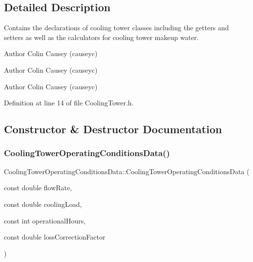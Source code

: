 \subsection{Detailed Description}
Contains the declarations of cooling tower classes including the getters and setters as well as the calculators for cooling tower makeup water. 

\begin{DoxyAuthor}{Author}
Colin Causey (causeyc) 
\end{DoxyAuthor}


\begin{DoxyAuthor}{Author}
Colin Causey (causeyc) 
\end{DoxyAuthor}


\begin{DoxyAuthor}{Author}
Colin Causey (causeyc) 
\end{DoxyAuthor}


Definition at line 14 of file Cooling\+Tower.\+h.



\subsection{Constructor \& Destructor Documentation}
\mbox{\label{class_cooling_tower_operating_conditions_data_a51e6445c137db249bdc8d02ff1e1b7ff}} 
\subsubsection{\texorpdfstring{Cooling\+Tower\+Operating\+Conditions\+Data()}{CoolingTowerOperatingConditionsData()}\hspace{0.1cm}{\footnotesize\ttfamily [1/3]}}
{\footnotesize\ttfamily Cooling\+Tower\+Operating\+Conditions\+Data\+::\+Cooling\+Tower\+Operating\+Conditions\+Data (\begin{DoxyParamCaption}\item[{const double}]{flow\+Rate,  }\item[{const double}]{cooling\+Load,  }\item[{const int}]{operational\+Hours,  }\item[{const double}]{loss\+Correction\+Factor }\end{DoxyParamCaption})\hspace{0.3cm}{\ttfamily [inline]}}


